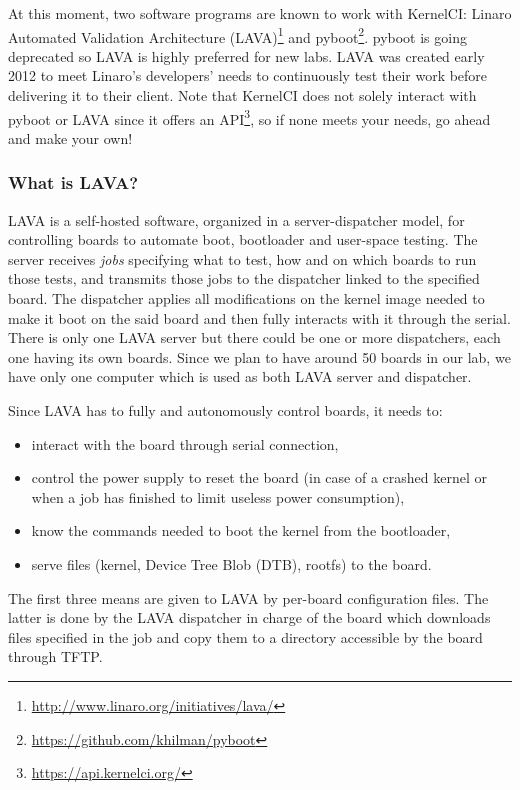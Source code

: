 At this moment, two software programs are known to work with KernelCI: Linaro Automated Validation Architecture (LAVA)\footnote{\url{http://www.linaro.org/initiatives/lava/}} and pyboot\footnote{\url{https://github.com/khilman/pyboot}}. pyboot is going deprecated so LAVA is highly preferred for new labs. LAVA was created early 2012 to meet Linaro's developers' needs to continuously test their work before delivering it to their client. Note that KernelCI does not solely interact with pyboot or LAVA since it offers an API\footnote{\url{https://api.kernelci.org/}}, so if none meets your needs, go ahead and make your own!

\subsubsection{What is LAVA?}

LAVA is a self-hosted software, organized in a server-dispatcher model, for controlling boards to automate boot, bootloader and user-space testing. The server receives \textit{jobs} specifying what to test, how and on which boards to run those tests, and transmits those jobs to the dispatcher linked to the specified board. The dispatcher applies all modifications on the kernel image needed to make it boot on the said board and then fully interacts with it through the serial. There is only one LAVA server but there could be one or more dispatchers, each one having its own boards. Since we plan to have around 50 boards in our lab, we have only one computer which is used as both LAVA server and dispatcher.

Since LAVA has to fully and autonomously control boards, it needs to:
\begin{itemize}
  \item interact with the board through serial connection,
  \item control the power supply to reset the board (in case of a crashed kernel or when a job has finished to limit useless power consumption),
  \item know the commands needed to boot the kernel from the bootloader,
  \item serve files (kernel, Device Tree Blob (DTB), rootfs) to the board.
\end{itemize}

The first three means are given to LAVA by per-board configuration files. The latter is done by the LAVA dispatcher in charge of the board which downloads files specified in the job and copy them to a directory accessible by the board through TFTP.

